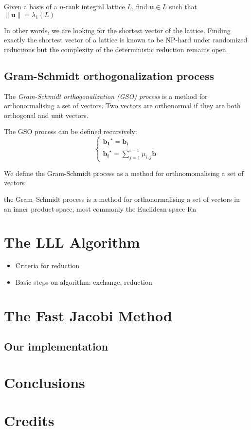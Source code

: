 \documentclass[10pt]{article}
\renewcommand{\vec}[1]{\mathbf{#1}}
\begin{document}
Given a basis of a $n$-rank integral lattice $L$, find $\vec{u} \in L$ such that $\|\vec{u}\| = \lambda_1 (L)$

In other words, we are looking for the shortest vector of the lattice. Finding exactly the shortest vector of a lattice is known to be NP-hard under randomized reductions\cite{Ajtai:1998:SVP} but the complexity of the deterministic reduction remains open.

\subsection{Gram-Schmidt orthogonalization process}
The \emph{Gram-Schmidt orthogonalization (\emph GSO) process} is a method for orthonormalising a set of vectors. Two vectors are orthonormal if they are both orthogonal and unit vectors. 

The GSO process  can be defined recursively:
\[
\begin{cases}
\vec{b_1}^{\star} = \vec{b_i}  \\
\vec{b_i}^{\star} = \displaystyle\sum^{i-1}_{j=1} \mu_{i,j} \vec{b}
\end{cases}
\]


We define the Gram-Schmidt process as a method for orthnomomalising a set of vectors 

the Gram–Schmidt process is a method for orthonormalising a set of vectors in an inner product space, most commonly the Euclidean space Rn

\section{The LLL Algorithm}



\begin{itemize}
\item Criteria for reduction
\item Basic steps on algorithm: exchange, reduction
\end{itemize}

\section{The Fast Jacobi Method}
\subsection{Our implementation}

\section{Conclusions}




\section{Credits}
\end{document}
